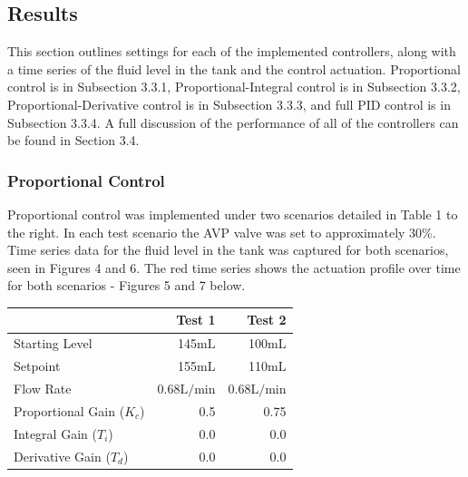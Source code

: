 \documentclass{article}
\begin{document}
\subsection{Results}
This section outlines settings for each of the implemented controllers, along with a time series of the fluid level in the tank and the control actuation. Proportional control is in Subsection 3.3.1, Proportional-Integral control is in Subsection 3.3.2, Proportional-Derivative control is in Subsection 3.3.3, and full PID control is in Subsection 3.3.4. A full discussion of the performance of all of the controllers can be found in Section 3.4.

\newpage

\subsubsection{Proportional Control}

\begin{minipage}{0.45\textwidth}
Proportional control was implemented under two scenarios detailed in Table 1 to the right. In each test scenario the AVP valve was set to approximately 30\%. Time series data for the fluid level in the tank was captured for both scenarios, seen in Figures 4 and 6. The red time series shows the actuation profile over time for both scenarios - Figures 5 and 7 below. 
\end{minipage}
\hspace{1cm}
\begin{minipage}{0.45\textwidth}
	\small
	\begin{tabular}{lrr}
		\toprule
		 & Test 1 & Test 2 \\
		\midrule
		Starting Level & 145$\si{\milli\liter}$ & 100$\si{\milli\liter}$ \\
		Setpoint & 155$\si{\milli\liter}$ & 110$\si{\milli\liter}$ \\
		Flow Rate & 0.68$\si{\liter\per\minute}$ & 0.68$\si{\liter\per\minute}$ \\
		Proportional Gain ($K_c$) & 0.5 & 0.75 \\
		Integral Gain ($T_i$) & 0.0 & 0.0 \\
		Derivative Gain ($T_d$) & 0.0 & 0.0 \\
		\bottomrule
	\end{tabular}
\end{minipage}

\vspace{2cm}
\end{document}
